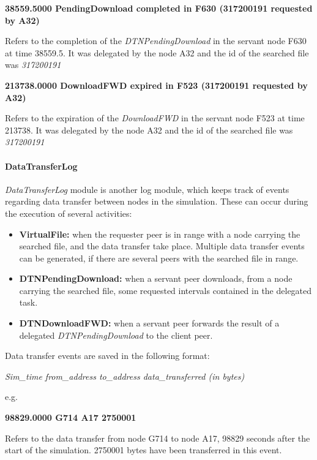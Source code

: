 \begin{center}
\textbf{38559.5000 PendingDownload completed in F630 (317200191 requested by A32)}
\end{center}
Refers to the completion of the \textit{DTNPendingDownload} in the servant node F630 at time 38559.5. It was delegated by the node A32 and the id of the searched file was \textit{317200191}
\\

\begin{center}
\textbf{213738.0000	DownloadFWD expired in F523 (317200191 requested by A32)}
\end{center}
Refers to the expiration of the \textit{DownloadFWD} in the servant node F523 at time 213738. It was delegated by the node A32 and the id of the searched file was \textit{317200191}
\\

\paragraph{DataTransferLog}
\textit{DataTransferLog} module is another log module, which keeps track of events regarding data transfer between nodes in the simulation. These can occur during the execution of several activities:
\begin{itemize}
\item \textbf{VirtualFile:} when the requester peer is in range with a node carrying the searched file, and the data transfer take place. Multiple data transfer events can be generated, if there are several peers with the searched file in range.
\item \textbf{DTNPendingDownload:} when a servant peer downloads, from a node carrying the searched file, some requested intervals contained in the delegated task.
\item \textbf{DTNDownloadFWD:} when a servant peer forwards the result of a delegated \textit{DTNPendingDownload} to the client peer.
\end{itemize}
Data transfer events are saved in the following format:
\begin{center}
\textit{Sim\_time	from\_address	to\_address	data\_transferred (in bytes)}
\end{center}
e.g.
\begin{center}
\textbf{98829.0000	G714	A17	2750001}
\end{center}
Refers to the data transfer from node G714 to node A17, 98829 seconds after the start of the simulation. 2750001 bytes have been transferred in this event.
\\

